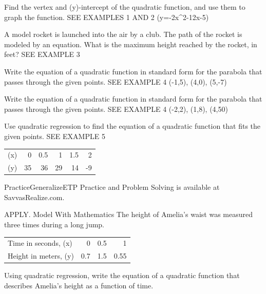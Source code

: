 \documentclass{article}
\newenvironment{practice}[2]{}{}        %
\newenvironment{te-addendum}[2]{}{}     %
\newcommand{\answer}[1]{}               %
\newcommand{\placeholder}[2]{}          %
\begin{document}
\begin{practice}{20}{2}
Find the vertex and (y)-intercept of the quadratic function, and use them to graph the function. SEE EXAMPLES 1 AND 2
(y=-2x^2-12x-5)
\answer{vertex: (-3,13); (y)-intercept: (0,-5)}
\placeholder{graph}{Answer 20, PDF page 32: red downward parabola (y=-2x^2-12x-5), vertex (-3,13), (y)-intercept (0,-5), both lower ends arrowed. Black arrowed (x),(y) axes, O at origin, grid spacing 5, window [-25,25] both axes, labels -20,-10,10,20.}
\end{practice}
\begin{practice}{21}{2}
A model rocket is launched into the air by a club. The path of the rocket is modeled by an equation. What is the maximum height reached by the rocket, in feet? SEE EXAMPLE 3
\placeholder{illustration}{Blue, white, and red model rocket on a launch stand in a grassy yard beside a wooden fence. Callout to rocket: (y=-10x^2+19x).}
\answer{9.025 ft}
\end{practice}
\begin{practice}{22}{2}
Write the equation of a quadratic function in standard form for the parabola that passes through the given points. SEE EXAMPLE 4
(-1,5), (4,0), (5,-7)
\answer{(y=-x^2+2x+8)}
\end{practice}
\begin{practice}{23}{2}
Write the equation of a quadratic function in standard form for the parabola that passes through the given points. SEE EXAMPLE 4
(-2,2), (1,8), (4,50)
\answer{(y=2x^2+4x+2)}
\end{practice}
\begin{practice}{24}{2}
Use quadratic regression to find the equation of a quadratic function that fits the given points. SEE EXAMPLE 5
\begin{tabular}{lrrrrr}
(x) & 0 & 0.5 & 1 & 1.5 & 2 \\
(y) & 35 & 36 & 29 & 14 & -9 \\
\end{tabular}
\answer{(y=-16x^2+10x+35)}
\end{practice}
\begin{te-addendum}{Practice}{GeneralizeETP}
Practice and Problem Solving is available at SavvasRealize.com.
\end{te-addendum}
\begin{practice}{25}{2}
APPLY. Model With Mathematics The height of Amelia's waist was measured three times during a long jump.
\begin{tabular}{lrrr}
Time in seconds, (x) & 0 & 0.5 & 1 \\
Height in meters, (y) & 0.7 & 1.5 & 0.55 \\
\end{tabular}
\placeholder{photo}{Athlete in blue top jumping over a sand pit, knees bent and arms raised. Vertical dimension from the sand to waist level labeled (h=1.5) meters. Track and stadium behind.}
Using quadratic regression, write the equation of a quadratic function that describes Amelia's height as a function of time.
\answer{(y=-3.5x^2+3.35x+0.7)}
\end{practice}
\end{document}

